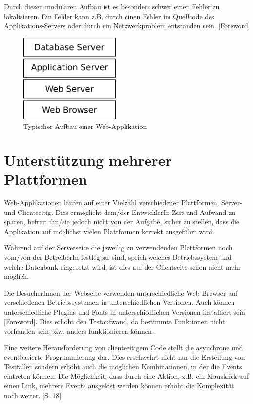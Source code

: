\documentclass[a4paper,bibtotoc,oneside]{scrbook}
\begin{document}
Durch diesen modularen Aufbau ist es besonders schwer einen Fehler zu lokalisieren. Ein Fehler kann z.B. durch einen Fehler im Quellcode des Applikations-Servers oder durch ein Netzwerkproblem entstanden sein. \cite{testing_apps_on_web}[Foreword]

\begin{figure}[h!]
\centering
\includegraphics[width=50mm]{img/webstack.png}
\caption[Typischer Aufbau einer Web-Applikation]{Typischer Aufbau einer Web-Applikation}\label{Abb4}
\end{figure}

\section{Unterstützung mehrerer Plattformen}
Web-Applikationen laufen auf einer Vielzahl verschiedener Plattformen, Server- und Clientseitig. Dies ermöglicht dem/der EntwicklerIn Zeit und Aufwand zu sparen, befreit ihn/sie jedoch nicht von der Aufgabe, sicher zu stellen, dass die Applikation auf möglichst vielen Plattformen korrekt ausgeführt wird.

Während auf der Serverseite die jeweilig zu verwendenden Plattformen noch vom/von der BetreiberIn festlegbar sind, sprich welches Betriebssystem und welche Datenbank eingesetzt wird, ist dies auf der Clientseite schon nicht mehr möglich. 

Die BesucherInnen der Webseite verwenden unterschiedliche Web-Browser auf verschiedenen Betriebssystemen in unterschiedlichen Versionen. Auch können unterschiedliche Plugins und Fonts in unterschiedlichen Versionen installiert sein \cite{testing_apps_on_web}[Foreword]. Dies erhöht den Testaufwand, da bestimmte Funktionen nicht vorhanden sein bzw. anders funktionieren können \cite{caniuse}.

Eine weitere Herausforderung von clientseitigem Code stellt die asynchrone und eventbasierte Programmierung dar. Dies erschwehrt nicht nur die Erstellung von Testfällen sondern erhöht auch die möglichen Kombinationen, in der die Events eintreten können. Die Möglichkeit, dass durch eine Aktion, z.B. ein Mausklick auf einen Link, mehrere Events ausgelöst werden können erhöht die Komplexität noch weiter. \cite{testing_apps_on_web}[S. 18]
\end{document}
